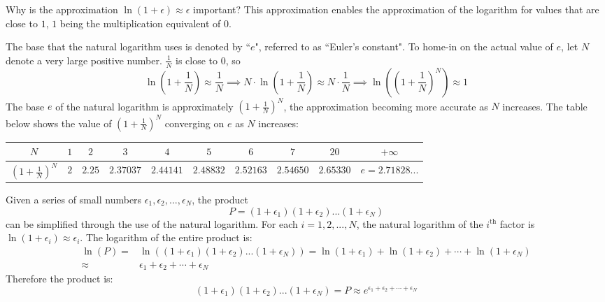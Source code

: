 \documentclass{article}
\begin{document}
Why is the approximation \(\ln(1 + \epsilon) \approx \epsilon\) important? This approximation enables the approximation of the logarithm for values that are close to \(1\), \(1\) being the multiplication equivalent of \(0\). 

The base that the natural logarithm uses is denoted by ``\(e\)", referred to as ``Euler's constant". To home-in on the actual value of \(e\), let \(N\) denote a very large positive number. \(\frac{1}{N}\) is close to \(0\), so 
\[\ln\left(1 + \frac{1}{N}\right) \approx \frac{1}{N} \implies N \cdot \ln\left(1 + \frac{1}{N}\right) \approx N \cdot \frac{1}{N} \implies \ln\left(\left(1 + \frac{1}{N}\right)^N\right) \approx 1\]
The base \(e\) of the natural logarithm is approximately \(\left(1 + \frac{1}{N}\right)^N\), the approximation becoming more accurate as \(N\) increases. The table below shows the value of \(\left(1 + \frac{1}{N}\right)^N\) converging on \(e\) as \(N\) increases:
\begin{tabular}{|c||c|c|c|c|c|c|c|c||c|}
\hline
\(N\)                                               & \(1\) & \(2\)      & \(3\)            & \(4\)             & \(5\)            & \(6\)            & \(7\)             & \(20\)          & \(+\infty\) \\
\hline
\(\left(1 + \frac{1}{N}\right)^N\) & \(2\) & \(2.25\) & \(2.37037\) & \(2.44141\) & \(2.48832\) & \(2.52163\) & \(2.54650\) & \(2.65330\) & \(e = 2.71828...\) \\
\hline
\end{tabular}

\vspace{5mm}

Given a series of small numbers \(\epsilon_1, \epsilon_2, ..., \epsilon_N\), the product 
\[P = (1 + \epsilon_1)(1 + \epsilon_2)...(1 + \epsilon_N)\]
can be simplified through the use of the natural logarithm. For each \(i = 1, 2, ..., N\), the natural logarithm of the \(i^\text{th}\) factor is \(\ln(1 + \epsilon_i) \approx \epsilon_i\). The logarithm of the entire product is:
\begin{align*}
\ln(P) = & \ln((1 + \epsilon_1)(1 + \epsilon_2)...(1 + \epsilon_N)) 
= \ln(1 + \epsilon_1) + \ln(1 + \epsilon_2) + \cdots + \ln(1 + \epsilon_N) \\
\approx & \epsilon_1 + \epsilon_2 + \cdots + \epsilon_N
\end{align*}
Therefore the product is:
\[(1 + \epsilon_1)(1 + \epsilon_2)...(1 + \epsilon_N) = P \approx e^{\epsilon_1 + \epsilon_2 + \cdots + \epsilon_N}\]  
\end{document}
